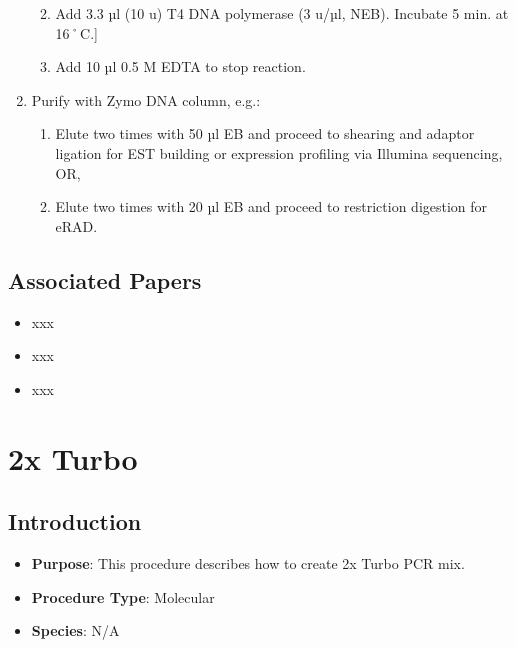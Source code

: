 \documentclass[
  letterpaper,
  DIV=11,
  numbers=noendperiod]{scrreprt}
\providecommand{\tightlist}{%
  \setlength{\itemsep}{0pt}\setlength{\parskip}{0pt}}\usepackage{longtable,booktabs,array}
\begin{document}
\begin{enumerate}
  \begin{enumerate}
  \def\labelenumii{\arabic{enumii}.}
  \tightlist
  \item
    Add 3.3 µl (10 u) T4 DNA polymerase (3 u/µl, NEB). Incubate 5 min.
    at 16˚C.{]}
  \item
    Add 10 µl 0.5 M EDTA to stop reaction.
  \end{enumerate}
\item
  Purify with Zymo DNA column, e.g.:

  \begin{enumerate}
  \def\labelenumii{\arabic{enumii}.}
  \tightlist
  \item
    Elute two times with 50 µl EB and proceed to shearing and adaptor
    ligation for EST building or expression profiling via Illumina
    sequencing, OR,
  \item
    Elute two times with 20 µl EB and proceed to restriction digestion
    for eRAD.
  \end{enumerate}
\end{enumerate}

\hypertarget{associated-papers-10}{%
\section{Associated Papers}\label{associated-papers-10}}

\begin{itemize}
\tightlist
\item
  xxx
\item
  xxx
\item
  xxx
\end{itemize}

\hypertarget{sec-molecular-2x_Turbo}{%
\chapter{2x Turbo}\label{sec-molecular-2x_Turbo}}

\hypertarget{introduction-13}{%
\section{Introduction}\label{introduction-13}}

\begin{itemize}
\tightlist
\item
  \textbf{Purpose}: This procedure describes how to create 2x Turbo PCR
  mix.
\item
  \textbf{Procedure Type}: Molecular
\item
  \textbf{Species}: N/A
\end{itemize}
\end{document}
